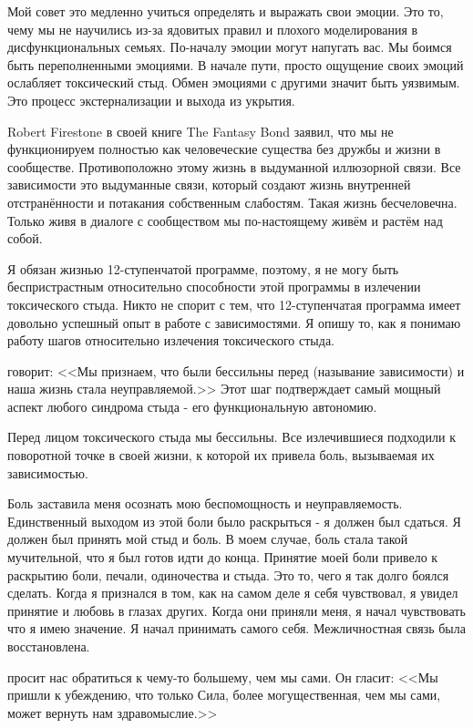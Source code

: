 \documentclass[10pt, fleqn]{article}
\begin{document}
Мой совет это медленно учиться определять и выражать свои эмоции. Это то, чему мы не научились из-за ядовитых правил и плохого моделирования в дисфункциональных семьях. По-началу эмоции могут напугать вас. Мы боимся быть переполненными эмоциями. В начале пути, просто ощущение своих эмоций ослабляет токсический стыд. Обмен эмоциями с другими значит быть уязвимым. Это процесс экстернализации и выхода из укрытия.

Robert Firestone в своей книге The Fantasy Bond заявил, что мы не функционируем полностью как человеческие существа без дружбы и жизни в сообществе. Противоположно этому жизнь в выдуманной иллюзорной связи. Все зависимости это выдуманные связи, который создают жизнь внутренней отстранённости и потакания собственным слабостям. Такая жизнь бесчеловечна. Только живя в диалоге с сообществом мы по-настоящему живём и растём над собой.


Я обязан жизнью 12-ступенчатой программе, поэтому, я не могу быть беспристрастным относительно способности этой программы в излечении токсического стыда. Никто не спорит с тем, что 12-ступенчатая программа имеет довольно успешный опыт в работе с зависимостями. Я опишу то, как я понимаю работу шагов относительно излечения токсического стыда. 

 говорит: <<Мы признаем, что были бессильны перед (называние зависимости) и наша жизнь стала неуправляемой.>> Этот шаг подтверждает самый мощный аспект любого синдрома стыда - его функциональную автономию.

Перед лицом токсического стыда мы бессильны. Все излечившиеся подходили к поворотной точке в своей жизни, к которой их привела боль, вызываемая их зависимостью.

Боль заставила меня осознать мою беспомощность и неуправляемость. Единственный выходом из этой боли было раскрыться - я должен был сдаться. Я должен был принять мой стыд и боль. В моем случае, боль стала такой мучительной, что я был готов идти до конца. Принятие моей боли привело к раскрытию боли, печали, одиночества и стыда. Это то, чего я так долго боялся сделать. Когда я признался в том, как на самом деле я себя чувствовал, я увидел принятие и любовь в глазах других. Когда они приняли меня, я начал чувствовать что я имею значение. Я начал принимать самого себя. Межличностная связь была восстановлена.

 просит нас обратиться к чему-то большему, чем мы сами. Он гласит: <<Мы пришли к убеждению, что только Сила, более могущественная, чем мы сами, может вернуть нам здравомыслие.>>
\end{document}
